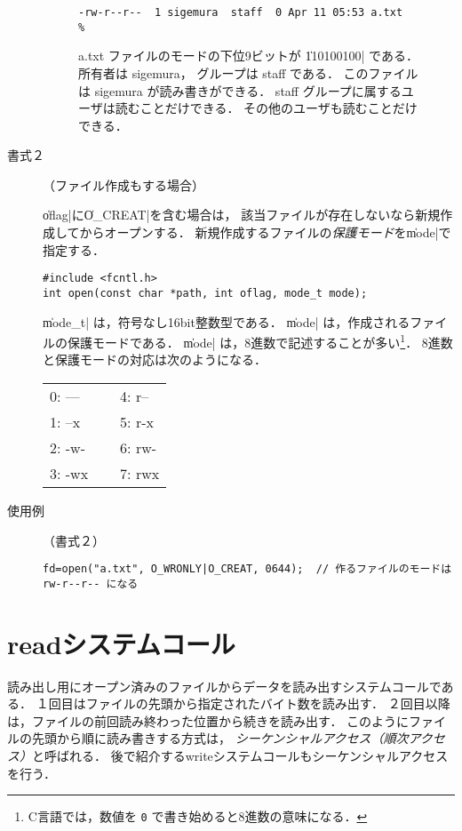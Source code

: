 \begin{description}
\begin{figure}[tb]
\begin{framed}
\begin{lstlisting}[numbers=none]
% ls -l a.txt
-rw-r--r--  1 sigemura  staff  0 Apr 11 05:53 a.txt
%
\end{lstlisting}

a.txt ファイルのモードの下位9ビットが \|110100100| である．
所有者は sigemura，
グループは staff である．
このファイルは sigemura が読み書きができる．
staff グループに属するユーザは読むことだけできる．
その他のユーザも読むことだけできる．
\end{framed}
\end{figure}

\item[書式２]（ファイル作成もする場合）

\|oflag|に\|O_CREAT|を含む場合は，
該当ファイルが存在しないなら新規作成してからオープンする．
新規作成するファイルの\emph{保護モード}を\|mode|で指定する．

\begin{lstlisting}[numbers=none]
#include <fcntl.h>
int open(const char *path, int oflag, mode_t mode);
\end{lstlisting}

\|mode_t| は，符号なし16bit整数型である．
\|mode| は，作成されるファイルの保護モードである．
\|mode| は，8進数で記述することが多い\footnote{
C言語では，数値を \texttt{0} で書き始めると8進数の意味になる．}．
8進数と保護モードの対応は次のようになる．

{\ttfamily\begin{center}\begin{tabular}{l l}
0: --- ~~~ & 4: r-- \\
1: --x     & 5: r-x \\
2: -w-     & 6: rw- \\
3: -wx     & 7: rwx
\end{tabular}\end{center}}

\item[使用例]（書式２）

\begin{lstlisting}[numbers=none]
fd=open("a.txt", O_WRONLY|O_CREAT, 0644);  // 作るファイルのモードは rw-r--r-- になる
\end{lstlisting}

\end{description}

\section{readシステムコール}
読み出し用にオープン済みのファイルからデータを読み出すシステムコールである．
１回目はファイルの先頭から指定されたバイト数を読み出す．
２回目以降は，ファイルの前回読み終わった位置から続きを読み出す．
このようにファイルの先頭から順に読み書きする方式は，
\emph{シーケンシャルアクセス（順次アクセス）}と呼ばれる．
後で紹介するwriteシステムコールもシーケンシャルアクセスを行う．

